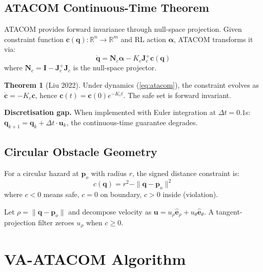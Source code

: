 \documentclass[letterpaper]{article}
\begin{document}
\subsection{ATACOM Continuous-Time Theorem}

ATACOM \cite{liu2022} provides forward invariance through null-space projection. Given constraint function $\boldsymbol{c}(\boldsymbol{q}): \mathbb{R}^n \to \mathbb{R}^m$ and RL action $\boldsymbol{\alpha}$, ATACOM transforms it via:
\begin{equation}
\dot{\boldsymbol{q}} = \boldsymbol{N}_c \boldsymbol{\alpha} - K_c \boldsymbol{J}_c^+ \boldsymbol{c}(\boldsymbol{q})
\label{eq:atacom}
\end{equation}
where $\boldsymbol{N}_c = \boldsymbol{I} - \boldsymbol{J}_c^+ \boldsymbol{J}_c$ is the null-space projector.

\textbf{Theorem 1} (Liu 2022). Under dynamics (\ref{eq:atacom}), the constraint evolves as $\dot{\boldsymbol{c}} = -K_c \boldsymbol{c}$, hence $\boldsymbol{c}(t) = \boldsymbol{c}(0) e^{-K_c t}$. The safe set is forward invariant.

\textbf{Discretisation gap.} When implemented with Euler integration at $\Delta t = 0.1$s: $\boldsymbol{q}_{k+1} = \boldsymbol{q}_k + \Delta t \cdot \boldsymbol{u}_k$, the continuous-time guarantee degrades.

\subsection{Circular Obstacle Geometry}

For a circular hazard at $\boldsymbol{p}_o$ with radius $r$, the signed distance constraint is:
\begin{equation}
c(\boldsymbol{q}) = r^2 - \|\boldsymbol{q} - \boldsymbol{p}_o\|^2
\end{equation}
where $c < 0$ means safe, $c = 0$ on boundary, $c > 0$ inside (violation).

Let $\rho = \|\boldsymbol{q} - \boldsymbol{p}_o\|$ and decompose velocity as $\boldsymbol{u} = u_\rho \hat{\boldsymbol{e}}_\rho + u_\theta \hat{\boldsymbol{e}}_\theta$. A tangent-projection filter zeroes $u_\rho$ when $c \ge 0$.

\section{VA-ATACOM Algorithm}
\label{sec:method}
\end{document}
